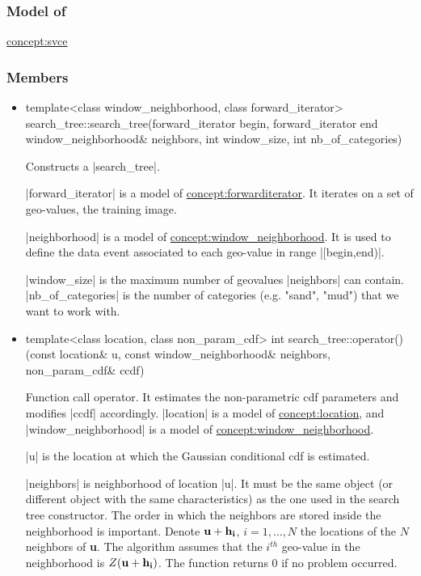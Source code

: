 \documentclass[12pt,twoside]{report}
\newcommand{\loc}[1]{{\bf #1}}
\newcommand{\mloc}[1]{\rm{\bf #1}}
\begin{document}
\htmlrule[CLEAR=all]  \subsubsection*{Model of}
\hyperref{Single Variable Cdf Estimator}{Single Variable Cdf Estimator (see Section}{)}{concept:svce}


\htmlrule[CLEAR=all]  \subsubsection*{Members}
\begin{itemize}

\item
 \begin{code} 
template<class window_neighborhood, class forward_iterator>
search_tree::search_tree(forward_iterator begin, forward_iterator end
                         window_neighborhood& neighbors,
                         int window_size, int nb_of_categories)
\end{code}

Constructs a |search_tree|. 

|forward_iterator| is a model of \hyperref{Forward Iterator}{Forward Iterator (see Section}{)}{concept:forwarditerator}. It iterates on a set of geo-values, the training image.

|neighborhood| is a model of \hyperref{Window Neighborhood}{Window Neighborhood (see Section}{)}{concept:window_neighborhood}. It is used to define the data event associated to each geo-value in range |[begin,end)|.

|window_size| is the maximum number of geovalues |neighbors| can contain. |nb_of_categories| is the number of categories (e.g. "sand", "mud") that we want to work with.



\item
 \begin{code}
template<class location, class non_param_cdf> 
int search_tree::operator()(const location& u, 
                            const window_neighborhood& neighbors,
                            non_param_cdf& ccdf)
  \end{code}

Function call operator. It estimates the non-parametric cdf parameters and modifies |ccdf| accordingly. 
|location| is a model of \hyperref{Location}{Location (see Section}{)}{concept:location}, and |window_neighborhood| is a model of \hyperref{Window Neighborhood}{Window Neighborhood (see Section}{)}{concept:window_neighborhood}. 

|u| is the location at which the Gaussian conditional cdf is estimated. 

|neighbors| is neighborhood of location |u|. It must be the same object (or different object with the same characteristics) as the one used in the search tree constructor. The order in which the neighbors are stored inside the neighborhood is important. Denote $\mloc{u}+\mloc{h_i}$, $i=1,\ldots,N$ the locations of the $N$ neighbors of \loc{u}. The algorithm assumes that the $i^{th}$ geo-value in the neighborhood is $Z(\mloc{u}+\mloc{h_i})$.
The function returns 0 if no problem occurred.
\end{itemize}
\end{document}
